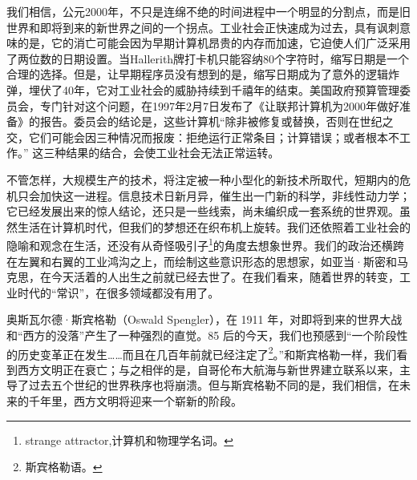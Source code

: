 我们相信，公元2000年，不只是连绵不绝的时间进程中一个明显的分割点，而是旧世界和即将到来的新世界之间的一个拐点。工业社会正快速成为过去，具有讽刺意味的是，它的消亡可能会因为早期计算机昂贵的内存而加速，它迫使人们广泛采用了两位数的日期设置。当Hallerith牌打卡机只能容纳80个字符时，缩写日期是一个合理的选择。但是，让早期程序员没有想到的是，缩写日期成为了意外的逻辑炸弹，埋伏了40年，它对工业社会的威胁持续到千禧年的结束。美国政府预算管理委员会，专门针对这个问题，在1997年2月7日发布了《让联邦计算机为2000年做好准备》的报告。委员会的结论是，这些计算机“除非被修复或替换，否则在世纪之交，它们可能会因三种情况而报废：拒绝运行正常条目；计算错误；或者根本不工作。” 这三种结果的结合，会使工业社会无法正常运转。


不管怎样，大规模生产的技术，将注定被一种小型化的新技术所取代，短期内的危机只会加快这一进程。信息技术日新月异，催生出一门新的科学，非线性动力学；它已经发展出来的惊人结论，还只是一些线索，尚未编织成一套系统的世界观。虽然生活在计算机时代，但我们的梦想还在织布机上旋转。我们还依照着工业社会的隐喻和观念在生活，还没有从奇怪吸引子\footnote{strange attractor,计算机和物理学名词。}的角度去想象世界。我们的政治还横跨在左翼和右翼的工业鸿沟之上，而绘制这些意识形态的思想家，如亚当·斯密和马克思，在今天活着的人出生之前就已经去世了。在我们看来，随着世界的转变，工业时代的“常识”，在很多领域都没有用了。


奥斯瓦尔德·斯宾格勒（Oswald Spengler），在 1911 年，对即将到来的世界大战和“西方的没落”产生了一种强烈的直觉。85 后的今天，我们也预感到“一个阶段性的历史变革正在发生……而且在几百年前就已经注定了\footnote{斯宾格勒语。}。”和斯宾格勒一样，我们看到西方文明正在衰亡；与之相伴的是，自哥伦布大航海与新世界建立联系以来，主导了过去五个世纪的世界秩序也将崩溃。但与斯宾格勒不同的是，我们相信，在未来的千年里，西方文明将迎来一个崭新的阶段。